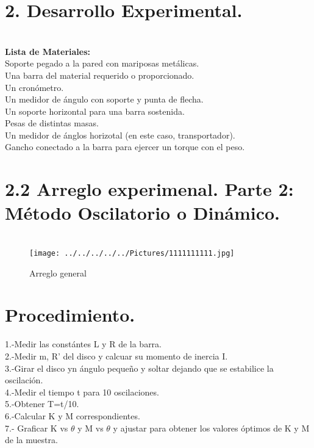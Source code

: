 \documentclass[10pt,a4paper]{article}
\begin{document}
\section*{2.  Desarrollo Experimental.}\\
\textbf{Lista de Materiales:} \\
Soporte pegado a la pared con mariposas met\'{a}licas.\\
Una barra del material requerido o proporcionado. \\
Un cron\'{o}metro. \\
Un medidor de \'{a}ngulo con soporte y punta de flecha. \\
Un soporte horizontal para una barra sostenida.\\
Pesas de distintas masas. \\
Un medidor de \'{a}nglos horizotal (en este caso, transportador).  \\
Gancho conectado a la barra para ejercer un torque con el peso. \\
\section*{2.2 Arreglo experimenal. Parte 2: M\'{e}todo Oscilatorio o Din\'{a}mico.}
\begin{figure}[hbtp]
\centering
\\
\texttt{[image: ../../../../../Pictures/1111111111.jpg]} 
\caption{Arreglo general}
\end{figure} 


\section*{Procedimiento.}
1.-Medir las const\'{a}ntes L y R de la barra.\\
2.-Medir m, R' del disco y calcuar su momento de inercia I.\\
3.-Girar el disco yn \'{a}ngulo peque\~{n}o y soltar dejando que se estabilice la oscilaci\'{o}n. \\
4.-Medir el tiempo t para 10 oscilaciones.\\
5.-Obtener T=t/10.\\
6.-Calcular K y M correspondientes.\\
7.- Graficar K vs $\theta$ y M vs $\theta$ y ajustar para obtener los valores \'{o}ptimos de K y M de la muestra.
\end{document}
